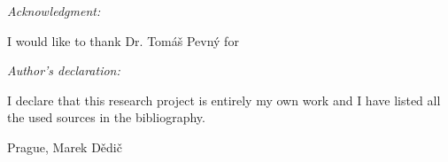 \noindent \textit{\Large Acknowledgment:}

\noindent I would like to thank Dr. Tomáš Pevný for 

\vfill

\noindent \textit{\Large Author's declaration:}

\noindent I declare that this research project is entirely my own work and I have listed all the used sources in the bibliography.

\bigskip

\noindent Prague, \documentdate\hfill Marek Dědič

\vspace{2cm}
